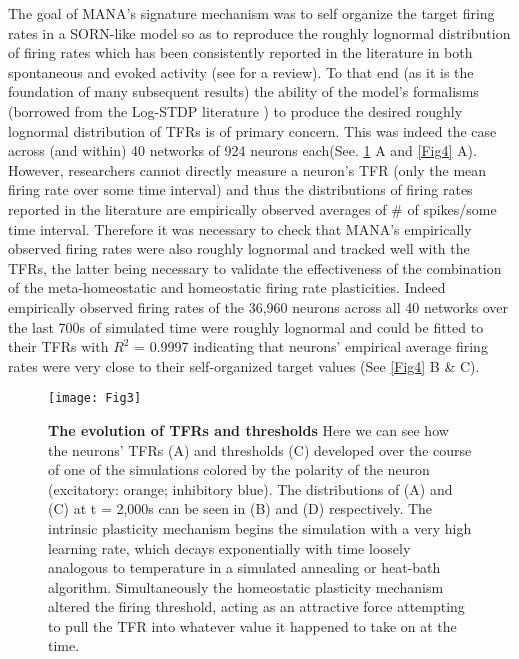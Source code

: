 \documentclass[10pt,letterpaper]{article}
\begin{document}
The goal of MANA's signature mechanism was to self organize the target firing rates in a SORN-like model so as to reproduce the roughly lognormal distribution of firing rates which has been consistently reported in the literature in both spontaneous and evoked activity \cite{hromadka2008sparse, mizuseki2013preconfigured, o2010neural, hirase2001firing}(see \cite{buzsaki2014log} for a review). To that end (as it is the foundation of many subsequent results) the ability of the model's formalisms (borrowed from the Log-STDP literature \cite{gilson2011stability}) to produce the desired roughly lognormal distribution of TFRs is of primary concern. This was indeed the case across (and within) 40 networks of 924 neurons each(See. \ref{Fig3} A and \ref{Fig4} A). However, researchers cannot directly measure a neuron's TFR (only the mean firing rate over some time interval) and thus the distributions of firing rates reported in the literature are empirically observed averages of \# of spikes/some time interval. Therefore it was necessary to check that MANA's empirically observed firing rates were also roughly lognormal and tracked well with the TFRs, the latter being necessary to validate the effectiveness of the combination of the meta-homeostatic and homeostatic firing rate plasticities. Indeed empirically observed firing rates of the 36,960 neurons across all 40 networks over the last 700s of simulated time were roughly lognormal and could be fitted to their TFRs with $R^2$ = 0.9997 indicating that neurons' empirical average firing rates were very close to their self-organized target values  (See \ref{Fig4} B \& C). 
		
\begin{figure}[!h]
	\texttt{[image: Fig3]}
	\caption{{\bf The evolution of TFRs and thresholds}
		\footnotesize  Here we can see how the neurons' TFRs (A) and thresholds (C) developed over the course of one of the simulations colored by the polarity of the neuron (excitatory: orange; inhibitory blue). The distributions of (A) and (C) at t = 2,000s can be seen in (B) and (D) respectively. The intrinsic plasticity mechanism begins the simulation with a very high learning rate, which decays exponentially with time loosely analogous to temperature in a simulated annealing or heat-bath algorithm. Simultaneously the homeostatic plasticity mechanism altered the firing threshold, acting as an attractive force attempting to pull the TFR into whatever value it happened to take on at the time. }
	\label{Fig3}
\end{figure}
\end{document}
